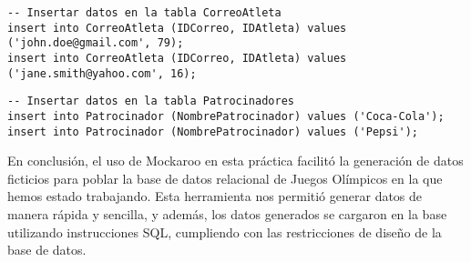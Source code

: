 \begin{verbatim}
-- Insertar datos en la tabla CorreoAtleta
insert into CorreoAtleta (IDCorreo, IDAtleta) values ('john.doe@gmail.com', 79);
insert into CorreoAtleta (IDCorreo, IDAtleta) values ('jane.smith@yahoo.com', 16);
\end{verbatim}

\begin{verbatim}
-- Insertar datos en la tabla Patrocinadores
insert into Patrocinador (NombrePatrocinador) values ('Coca-Cola');
insert into Patrocinador (NombrePatrocinador) values ('Pepsi');
\end{verbatim}


En conclusión, el uso de Mockaroo en esta práctica facilitó la generación de datos ficticios para poblar la base de datos relacional de Juegos Olímpicos en la que hemos estado trabajando. Esta herramienta nos permitió generar datos de manera rápida y sencilla, y además, los datos generados se cargaron en la base utilizando instrucciones SQL, cumpliendo con las restricciones de diseño de la base de datos.
